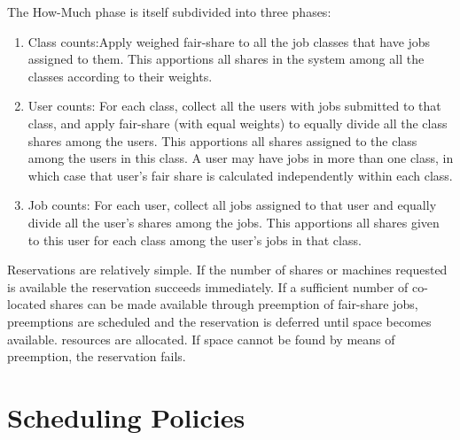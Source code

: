     The How-Much phase is itself subdivided into three phases:
    \begin{enumerate}
        \item Class counts:Apply weighed fair-share to all the job classes that have jobs assigned to
          them. This apportions all shares in the system among all the classes according to their
          weights.  

        \item User counts: For each class, collect all the users with jobs submitted to that
          class, and apply fair-share (with equal weights) to equally divide all the class shares among
          the users. This apportions all shares assigned to the class among the users in this class.  A
          user may have jobs in more than one class, in which case that user's fair share is calculated
          independently within each class.
          
        \item Job counts: For each user, collect all jobs
          assigned to that user and equally divide all the user's shares among
          the jobs. This apportions all shares given to this user for each class among the user's
          jobs in that class. 
    \end{enumerate}

    Reservations are relatively simple. If the number of shares or machines requested is available
    the reservation succeeds immediately.  If a sufficient number of co-located shares can be made
    available through preemption of fair-share jobs, preemptions are scheduled and the reservation
    is deferred until space becomes available.  resources are allocated. If space cannot be found by
    means of preemption, the reservation fails.


    \section{Scheduling Policies}

